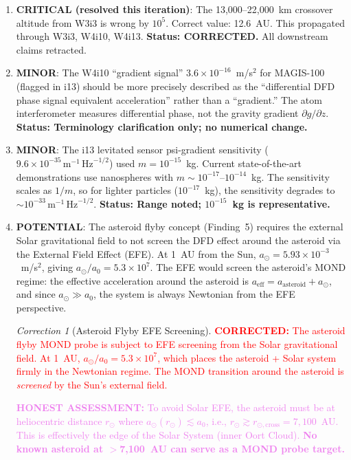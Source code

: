 \documentclass[11pt]{article}
\theoremstyle{definition}
\theoremstyle{remark}
\newtheorem{correction}[theorem]{Correction}
\newcommand{\ee}[1]{\times10^{#1}}
\newcommand{\sqrtHz}{\,\mathrm{Hz}^{-1/2}}
\newcommand{\azero}{a_0}
\newcommand{\corrected}[1]{\textcolor{red}{\textbf{CORRECTED:} #1}}
\newcommand{\honest}[1]{\textcolor{violet}{\textbf{HONEST ASSESSMENT:} #1}}
\begin{document}
\begin{enumerate}
\item \textbf{CRITICAL (resolved this iteration)}: The 13,000--22,000~km
  crossover altitude from W3i3 is wrong by $10^5$. Correct value:
  12.6~AU. This propagated through W3i3, W4i10, W4i13.
  \textbf{Status: CORRECTED.} All downstream claims retracted.

\item \textbf{MINOR}: The W4i10 ``gradient signal'' $3.6\ee{-16}$~m/s$^2$
  for MAGIS-100 (flagged in i13) should be more precisely described
  as the ``differential DFD phase signal equivalent acceleration''
  rather than a ``gradient.'' The atom interferometer measures
  differential phase, not the gravity gradient $\partial g / \partial z$.
  \textbf{Status: Terminology clarification only; no numerical change.}

\item \textbf{MINOR}: The i13 levitated sensor psi-gradient sensitivity
  ($9.6\ee{-35}\,\mathrm{m}^{-1}\sqrtHz$) used $m = 10^{-15}$~kg.
  Current state-of-the-art demonstrations use nanospheres with
  $m \sim 10^{-17}$--$10^{-14}$~kg. The sensitivity scales as $1/m$,
  so for lighter particles ($10^{-17}$~kg), the sensitivity degrades
  to $\sim 10^{-33}\,\mathrm{m}^{-1}\sqrtHz$.
  \textbf{Status: Range noted; $10^{-15}$~kg is representative.}

\item \textbf{POTENTIAL}: The asteroid flyby concept (Finding~5) requires
  the external Solar gravitational field to not screen the DFD effect
  around the asteroid via the External Field Effect (EFE). At 1~AU from
  the Sun, $a_\odot = 5.93\ee{-3}$~m/s$^2$, giving $a_\odot / \azero
  = 5.3\ee{7}$. The EFE would screen the asteroid's MOND regime: the
  effective acceleration around the asteroid is $a_{\mathrm{eff}} =
  a_{\mathrm{asteroid}} + a_\odot$, and since $a_\odot \gg \azero$,
  the system is always Newtonian from the EFE perspective.

  \begin{correction}[Asteroid Flyby EFE Screening]
  \label{cor:asteroid-efe}
  \corrected{The asteroid flyby MOND probe is subject to EFE screening
  from the Solar gravitational field. At 1~AU, $a_\odot / \azero
  = 5.3\ee{7}$, which places the asteroid + Solar system firmly in
  the Newtonian regime. The MOND transition around the asteroid is
  \emph{screened} by the Sun's external field.}

  \honest{To avoid Solar EFE, the asteroid must be at heliocentric
  distance $r_\odot$ where $a_\odot(r_\odot) \lesssim \azero$, i.e.,
  $r_\odot \gtrsim r_{\odot,\mathrm{cross}} = 7{,}100$~AU. This is
  effectively the edge of the Solar System (inner Oort Cloud).
  \textbf{No known asteroid at $>$7{,}100~AU can serve as a
  MOND probe target.}}


\end{correction}
\end{enumerate}
\end{document}
